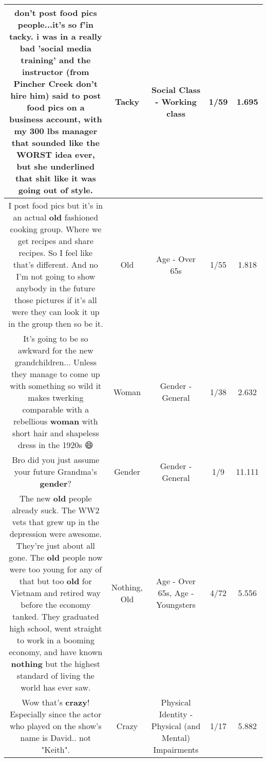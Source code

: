 \documentclass[11pt]{article}
\newlength\mylength
\begin{document}
\begin{center}
\begin{longtable}{|C{.65\mylength}|C{.30\mylength}|C{.12\mylength}|C{.12\mylength}|C{.12\mylength}|}
  \small don't post food pics people...it's so f'in \textbf{tacky}.  i was in a really bad 'social media training' and the instructor (from Pincher Creek don't hire him) said to post food pics on a business account, with my 300 lbs manager that sounded like the WORST idea ever, but she underlined that shit like it was going out of style.\normalsize   & Tacky & Social Class - Working class & 1/59 & 1.695 \\  \hline
  \small I post food pics but it's in an actual \textbf{old} fashioned cooking group. Where we get recipes and share recipes. So I feel like that's different. And no I'm not going to show anybody in the future those pictures if it's all were they can look it up in the group then so be it.\normalsize   & Old & Age - Over 65s & 1/55 & 1.818 \\  \hline
  \small It's going to be so awkward for the new grandchildren... Unless they manage to come up with something so wild it makes twerking comparable with a rebellious \textbf{woman} with short hair and shapeless dress in the 1920s 😄\normalsize   & Woman & Gender - General & 1/38 & 2.632 \\  \hline
  \small Bro did you just assume your future Grandma's \textbf{gender}?\normalsize   & Gender & Gender - General & 1/9 & 11.111 \\  \hline
  \small The new \textbf{old} people already suck. The WW2 vets that grew up in the depression were awesome. They're just about all gone. The \textbf{old} people now were too young for any of that but too \textbf{old} for Vietnam and retired way before the economy tanked. They graduated high school, went straight to work in a booming economy, and have known \textbf{nothing} but the highest standard of living the world has ever saw.\normalsize   & Nothing, Old & Age - Over 65s, Age - Youngsters & 4/72 & 5.556 \\  \hline
  \small Wow that's \textbf{crazy}! Especially since the actor who played on the show's name is David.. not "Keith".\normalsize   & Crazy & Physical Identity - Physical (and Mental) Impairments & 1/17 & 5.882 \\  \hline

\end{longtable}
\end{center}
\end{document}
